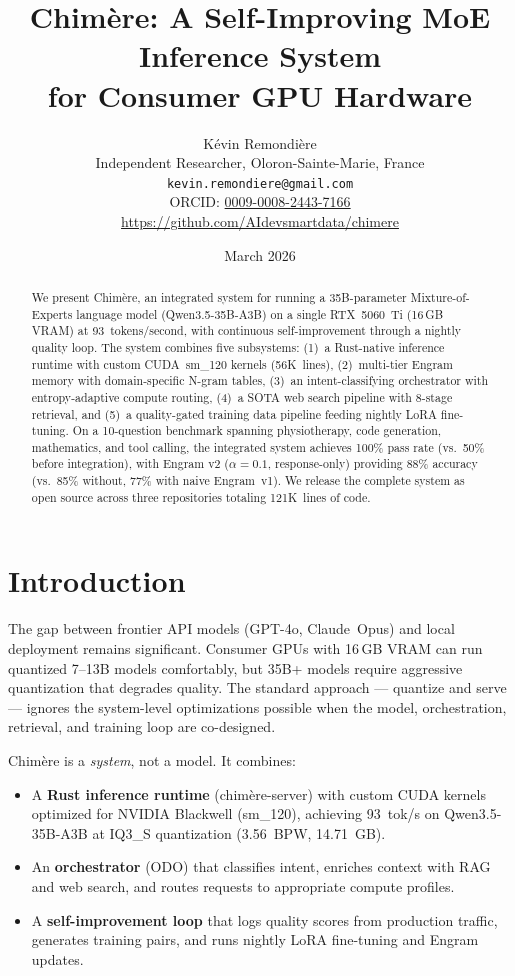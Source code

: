 \documentclass[10pt,a4paper]{article}
\title{Chim\`ere: A Self-Improving MoE Inference System\\for Consumer GPU Hardware}
\author{
  K\'evin Remondi\`ere\\
  Independent Researcher, Oloron-Sainte-Marie, France\\
  \texttt{kevin.remondiere@gmail.com}\\
  ORCID: \href{https://orcid.org/0009-0008-2443-7166}{0009-0008-2443-7166}\\
  \url{https://github.com/AIdevsmartdata/chimere}
}
\date{March 2026}
\begin{document}
\maketitle

\begin{abstract}
We present Chim\`ere, an integrated system for running a 35B-parameter Mixture-of-Experts language model (Qwen3.5-35B-A3B) on a single RTX~5060~Ti (16\,GB VRAM) at 93~tokens/second, with continuous self-improvement through a nightly quality loop. The system combines five subsystems: (1)~a Rust-native inference runtime with custom CUDA~sm\_120 kernels (56K~lines), (2)~multi-tier Engram memory with domain-specific N-gram tables, (3)~an intent-classifying orchestrator with entropy-adaptive compute routing, (4)~a SOTA web search pipeline with 8-stage retrieval, and (5)~a quality-gated training data pipeline feeding nightly LoRA fine-tuning. On a 10-question benchmark spanning physiotherapy, code generation, mathematics, and tool calling, the integrated system achieves 100\% pass rate (vs.\ 50\% before integration), with Engram v2 ($\alpha{=}0.1$, response-only) providing 88\% accuracy (vs.\ 85\% without, 77\% with naive Engram~v1). We release the complete system as open source across three repositories totaling 121K~lines of code.
\end{abstract}

\section{Introduction}

The gap between frontier API models (GPT-4o, Claude~Opus) and local deployment remains significant. Consumer GPUs with 16\,GB VRAM can run quantized 7--13B models comfortably, but 35B+ models require aggressive quantization that degrades quality. The standard approach --- quantize and serve --- ignores the system-level optimizations possible when the model, orchestration, retrieval, and training loop are co-designed.

Chim\`ere is a \emph{system}, not a model. It combines:
\begin{itemize}
  \item A \textbf{Rust inference runtime} (chim\`ere-server) with custom CUDA kernels optimized for NVIDIA Blackwell (sm\_120), achieving 93~tok/s on Qwen3.5-35B-A3B at IQ3\_S quantization (3.56~BPW, 14.71~GB).
  \item An \textbf{orchestrator} (ODO) that classifies intent, enriches context with RAG and web search, and routes requests to appropriate compute profiles.
  \item A \textbf{self-improvement loop} that logs quality scores from production traffic, generates training pairs, and runs nightly LoRA fine-tuning and Engram updates.
\end{itemize}
\end{document}
